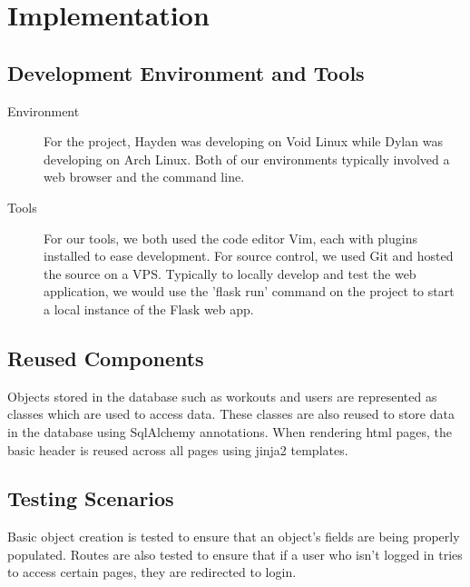 \documentclass[12pt]{article}
\begin{document}
\section{Implementation}
\subsection{Development Environment and Tools}
\begin{description}
	\item[Environment] For the project, Hayden was developing on Void Linux while Dylan was developing on Arch Linux. Both of our environments typically involved a web browser and the command line.
	\item[Tools] For our tools, we both used the code editor Vim, each with plugins installed to ease development. For source control, we used Git and hosted the source on a VPS. Typically to locally develop and test the web application, we would use the 'flask run' command on the project to start a local instance of the Flask web app.
\end{description}

\subsection{Reused Components}
Objects stored in the database such as workouts and users are represented as classes which are used to access data. These classes are also reused to store data in the database using SqlAlchemy annotations. When rendering html pages, the basic header is reused across all pages using jinja2 templates.

\subsection{Testing Scenarios}
Basic object creation is tested to ensure that an object’s fields are being properly populated. Routes are also tested to ensure that if a user who isn’t logged in tries to access certain pages, they are redirected to login.
\end{document}
